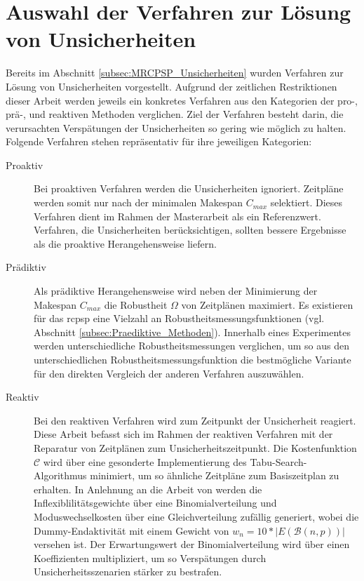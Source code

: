 \section{Auswahl der Verfahren zur Lösung von Unsicherheiten} \label{sec:AuswahlVerfahrenUnsicherheiten}

Bereits im Abschnitt \ref{subsec:MRCPSP_Unsicherheiten} wurden Verfahren zur Lösung von Unsicherheiten vorgestellt. Aufgrund der zeitlichen Restriktionen dieser Arbeit werden jeweils ein konkretes Verfahren aus den Kategorien der pro-, prä-, und reaktiven Methoden verglichen. Ziel der Verfahren besteht darin, die verursachten Verspätungen der Unsicherheiten so gering wie möglich zu halten. Folgende Verfahren stehen repräsentativ für ihre jeweiligen Kategorien:

\begin{description}
\item[Proaktiv] Bei proaktiven Verfahren werden die Unsicherheiten ignoriert. Zeitpläne werden somit nur nach der minimalen Makespan $C_{max}$ selektiert. Dieses Verfahren dient im Rahmen der Masterarbeit als ein Referenzwert. Verfahren, die Unsicherheiten berücksichtigen, sollten bessere Ergebnisse als die proaktive Herangehensweise liefern. 

\item[Prädiktiv] Als prädiktive Herangehensweise wird neben der Minimierung der Makespan $C_{max}$ die Robustheit $\Omega$ von Zeitplänen maximiert. Es existieren für das \ac{rcpsp} eine Vielzahl an Robustheitsmessungsfunktionen (vgl. Abschnitt \ref{subsec:Praediktive_Methoden}). Innerhalb eines Experimentes werden unterschiedliche Robustheitsmessungen verglichen, um so aus den unterschiedlichen Robustheitsmessungsfunktion die bestmögliche Variante für den direkten Vergleich der anderen Verfahren auszuwählen.  

\item[Reaktiv] Bei den reaktiven Verfahren wird zum Zeitpunkt der Unsicherheit reagiert. Diese Arbeit befasst sich im Rahmen der reaktiven Verfahren mit der Reparatur von Zeitplänen zum Unsicherheitszeitpunkt. Die Kostenfunktion $\mathcal{C}$ wird über eine gesonderte Implementierung des Tabu-Search-Algorithmus minimiert, um so ähnliche Zeitpläne zum Basiszeitplan zu erhalten. In Anlehnung an die Arbeit von \cite{deblaere_exact_2008} werden die Inflexiblilitätsgewichte über eine Binomialverteilung und Moduswechselkosten über eine Gleichverteilung zufällig generiert, wobei die Dummy-Endaktivität mit einem Gewicht von $w_n = 10 * |E(\mathcal{B}(n, p))|$ versehen ist. Der Erwartungswert der Binomialverteilung wird über einen Koeffizienten multipliziert, um so Verspätungen durch Unsicherheitsszenarien stärker zu bestrafen.

\end{description}


